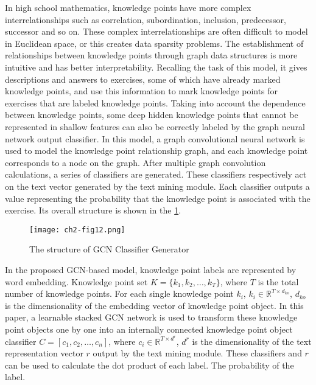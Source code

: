 In high school mathematics, knowledge points have more complex interrelationships such as correlation, subordination, inclusion, predecessor, successor and so on. These complex interrelationships are often difficult to model in Euclidean space, or this creates data sparsity problems. The establishment of relationships between knowledge points through graph data structures is more intuitive and has better interpretability. Recalling the task of this model, it gives descriptions and answers to exercises, some of which have already marked knowledge points, and use this information to mark knowledge points for exercises that are labeled knowledge points. Taking into account the dependence between knowledge points, some deep hidden knowledge points that cannot be represented in shallow features can also be correctly labeled by the graph neural network output classifier. In this model, a graph convolutional neural network is used to model the knowledge point relationship graph, and each knowledge point corresponds to a node on the graph. After multiple graph convolution calculations, a series of classifiers are generated. These classifiers respectively act on the text vector generated by the text mining module. Each classifier outputs a value representing the probability that the knowledge point is associated with the exercise. Its overall structure is shown in the \figurename{\ref{fig:ch2-fig12}}.

\begin{figure}[htbp!]
	\centering
	\texttt{[image: ch2-fig12.png]}
	\caption{The structure of GCN Classifier Generator}\label{fig:ch2-fig12}
\end{figure}

In the proposed GCN-based model, knowledge point labels are represented by word embedding. Knowledge point set \(K=\{k_1,k_2,\ldots,k_T\} \), where \(T\) is the total number of knowledge points. For each single knowledge point \(k_i\), \(k_i \in \mathbb{R}^{T\times d_{ko}}\), \(d_{ko}\) is the dimensionality of the embedding vector of knowledge point object. In this paper, a learnable stacked GCN network is used to transform these knowledge point objects one by one into an internally connected knowledge point object classifier \(C=[c_1,c_2,\ldots,c_n]\), where \(c_i\in\mathbb {R}^{T\times d^r}\), \(d^r\) is the dimensionality of the text representation vector \(r\) output by the text mining module. These classifiers and \(r\) can be used to calculate the dot product of each label. The probability of the label.

